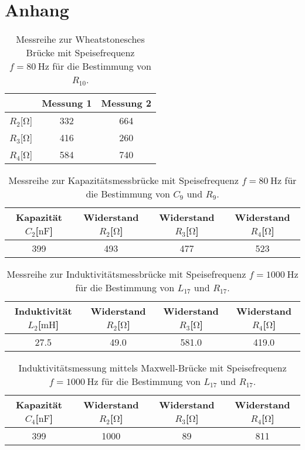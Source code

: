 \section{Anhang}

\begin{table}
    \centering
    \caption{Messreihe zur Wheatstonesches Brücke mit Speisefrequenz $f = \SI{80}{\hertz}$ für die Bestimmung von $R_{10}$.}
    \label{tab:weed}
    \begin{tabular}{c c c}
        \toprule
       ~ & Messung 1 & Messung 2 \\
        \midrule
      $R_{2}$[$\si{\ohm}$] & 332 &    664  \\
      $R_{3}$[$\si{\ohm}$] & 416 &    260\\
      $R_{4}$[$\si{\ohm}$] & 584 &    740\\
        \bottomrule
    \end{tabular}
    \end{table}

\begin{table}
    \centering
    \caption{Messreihe zur Kapazitätsmessbrücke mit Speisefrequenz $f = \SI{80}{\hertz}$ für die Bestimmung von $C_{9}$ und $R_{9}$.}
    \label{tab:nocap}
    \begin{tabular}{c c c c}
        \toprule
        Kapazität $C_{2}$[$\si{\nano\farad}$] & Widerstand $R_{2}$[$\si{\ohm}$] & Widerstand $R_{3}$[$\si{\ohm}$] & Widerstand $R_{4}$[$\si{\ohm}$]\\
        \midrule
        399 & 493 & 477 & 523  \\
        \bottomrule
    \end{tabular}
    \end{table}

\begin{table}
    \centering
    \caption{Messreihe zur Induktivitätsmessbrücke mit Speisefrequenz $f = \SI{1000}{\hertz}$ für die Bestimmung von $L_{17}$ und $R_{17}$.}
    \label{tab:spuleyo}
    \begin{tabular}{c c c c}
        \toprule
        Induktivität $L_{2}$[$\si{\milli\henry}$] & Widerstand $R_{2}$[$\si{\ohm}$] & Widerstand $R_{3}$[$\si{\ohm}$] & Widerstand $R_{4}$[$\si{\ohm}$]\\
        \midrule
        27.5 & 49.0 & 581.0 & 419.0  \\
        \bottomrule
    \end{tabular}
    \end{table}
 
\begin{table}[h!]
    \centering
    \caption{Induktivitätsmessung mittels Maxwell-Brücke mit Speisefrequenz $f = \SI{1000}{\hertz}$ für die Bestimmung von $L_{17}$ und $R_{17}$.}
    \label{tab:spuleyodiezweite}
    \begin{tabular}{c c c c}
        \toprule
        Kapazität $C_{4}$[$\si{\nano\farad}$] & Widerstand $R_{2}$[$\si{\ohm}$] & Widerstand $R_{3}$[$\si{\ohm}$] & Widerstand $R_{4}$[$\si{\ohm}$]\\
        \midrule
        399 & 1000 & 89 & 811  \\
        \bottomrule
    \end{tabular}
    \end{table}
    
